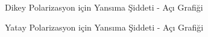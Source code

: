 \documentclass[11pt,letterpaper,twocolumn]{fenbil}
\begin{document}
\begin{figure}[H]
    \begin{center}
    \end{center}
    \caption{Dikey Polarizasyon için Yansıma Şiddeti - Açı Grafiği} 
    \label{fig:dikey}
\end{figure}

\begin{figure}[H]
    \begin{center}
    \end{center}
    \caption{Yatay Polarizasyon için Yansıma Şiddeti - Açı Grafiği} 
    \label{fig:yatay}
\end{figure}
\end{document}
